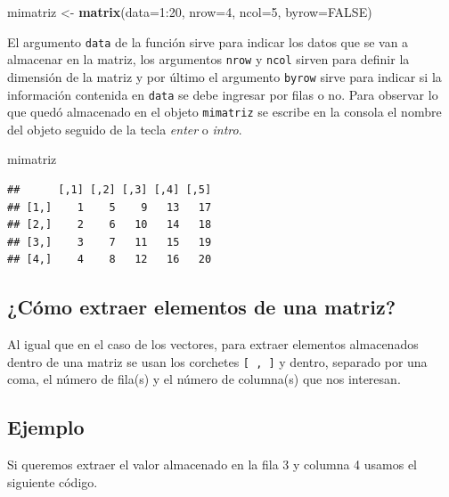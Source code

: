 \documentclass[10pt,]{krantz}
\makeatletter
\newenvironment{Shaded}{\begin{snugshade}}{\end{snugshade}}
\newcommand{\KeywordTok}[1]{\textcolor[rgb]{0.13,0.29,0.53}{\textbf{{#1}}}}
\newcommand{\DataTypeTok}[1]{\textcolor[rgb]{0.13,0.29,0.53}{{#1}}}
\newcommand{\DecValTok}[1]{\textcolor[rgb]{0.00,0.00,0.81}{{#1}}}
\newcommand{\StringTok}[1]{\textcolor[rgb]{0.31,0.60,0.02}{{#1}}}
\newcommand{\OtherTok}[1]{\textcolor[rgb]{0.56,0.35,0.01}{{#1}}}
\newcommand{\NormalTok}[1]{{#1}}
\newenvironment{kframe}{%
\medskip{}
\setlength{\fboxsep}{.8em}
 \def\at@end@of@kframe{}%
 \ifinner\ifhmode%
  \def\at@end@of@kframe{\end{minipage}}%
  \begin{minipage}{\columnwidth}%
 \fi\fi%
 \def\FrameCommand##1{\hskip\@totalleftmargin \hskip-\fboxsep
 \colorbox{shadecolor}{##1}\hskip-\fboxsep
     \hskip-\linewidth \hskip-\@totalleftmargin \hskip\columnwidth}%
 \MakeFramed {\advance\hsize-\width
   \@totalleftmargin\z@ \linewidth\hsize
   \@setminipage}}%
 {\par\unskip\endMakeFramed%
 \at@end@of@kframe}
\renewenvironment{Shaded}{\begin{kframe}}{\end{kframe}}
\makeatother
\begin{document}
\begin{Shaded}
\begin{Highlighting}[]
\NormalTok{mimatriz <-}\StringTok{ }\KeywordTok{matrix}\NormalTok{(}\DataTypeTok{data=}\DecValTok{1}\NormalTok{:}\DecValTok{20}\NormalTok{, }\DataTypeTok{nrow=}\DecValTok{4}\NormalTok{, }\DataTypeTok{ncol=}\DecValTok{5}\NormalTok{, }\DataTypeTok{byrow=}\OtherTok{FALSE}\NormalTok{)}
\end{Highlighting}
\end{Shaded}

El argumento \texttt{data} de la función sirve para indicar los datos
que se van a almacenar en la matriz, los argumentos \texttt{nrow} y
\texttt{ncol} sirven para definir la dimensión de la matriz y por último
el argumento \texttt{byrow} sirve para indicar si la información
contenida en \texttt{data} se debe ingresar por filas o no. Para
observar lo que quedó almacenado en el objeto \texttt{mimatriz} se
escribe en la consola el nombre del objeto seguido de la tecla
\textit{enter} o \textit{intro}.

\begin{Shaded}
\begin{Highlighting}[]
\NormalTok{mimatriz}
\end{Highlighting}
\end{Shaded}

\begin{verbatim}
##      [,1] [,2] [,3] [,4] [,5]
## [1,]    1    5    9   13   17
## [2,]    2    6   10   14   18
## [3,]    3    7   11   15   19
## [4,]    4    8   12   16   20
\end{verbatim}

\subsection{¿Cómo extraer elementos de una
matriz?}\label{como-extraer-elementos-de-una-matriz}

Al igual que en el caso de los vectores, para extraer elementos
almacenados dentro de una matriz se usan los corchetes
\texttt{{[}\ ,\ {]}} y dentro, separado por una coma, el número de
fila(s) y el número de columna(s) que nos interesan.

\subsection*{Ejemplo}\label{ejemplo-1}


Si queremos extraer el valor almacenado en la fila 3 y columna 4 usamos
el siguiente código.
\end{document}
